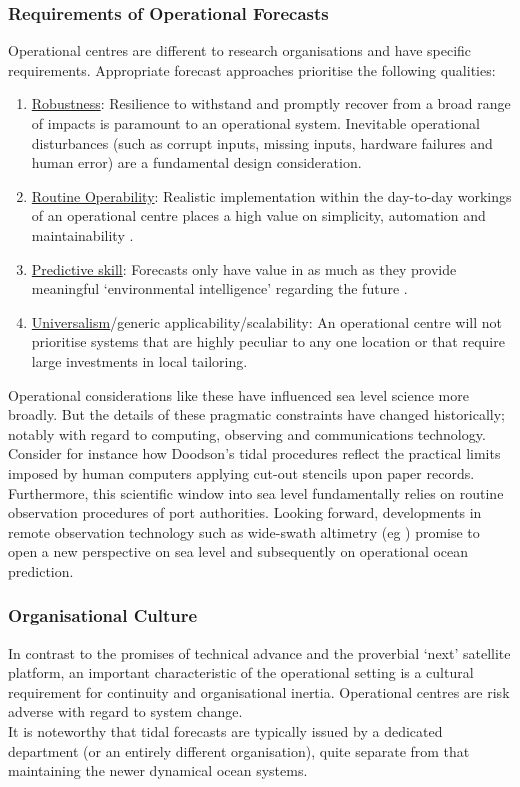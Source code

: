 \subsubsection{Requirements of Operational Forecasts}  
Operational centres are different to research organisations and have specific requirements. Appropriate forecast approaches prioritise the following qualities:
\begin{enumerate}
\item \underline{Robustness}: Resilience to withstand and promptly recover from a broad range of impacts is paramount to an operational system.  Inevitable operational disturbances (such as corrupt inputs, missing inputs, hardware failures and human error) are a fundamental design consideration.
\item \underline{Routine Operability}:  Realistic implementation within the day-to-day workings of an operational centre places a high value on simplicity, automation and maintainability .
\item \underline{Predictive skill}:  Forecasts only have value in as much as they provide meaningful `environmental intelligence' regarding the future \cite{BureauofMeterology:2010tq}.
\item \underline{Universalism}/generic applicability/scalability:  An operational centre will not prioritise systems that are highly peculiar to any one location or that require large investments in local tailoring.
\end{enumerate}



Operational considerations like these have influenced sea level science more broadly.   But the details of these pragmatic constraints have changed historically; notably with regard to computing, observing and communications technology.\\
Consider for instance how Doodson's \citep{Doodson:1928wf} tidal procedures reflect the practical limits imposed by human computers applying cut-out stencils upon paper records.  Furthermore, this scientific window into sea level fundamentally relies on routine observation procedures of port authorities.  Looking forward, developments in remote observation technology such as wide-swath altimetry (eg \citep{Ray:2011tj}) promise to open a new perspective on sea level and subsequently on operational ocean prediction. \\


\subsubsection{Organisational Culture}
In contrast to the promises of technical advance and the proverbial `next' satellite platform, an important characteristic of the operational  setting is a cultural requirement for continuity and organisational inertia.  Operational centres are risk adverse with regard to system change.  \\
It is noteworthy that tidal forecasts are typically issued by a dedicated department (or an entirely different organisation), quite separate from that maintaining the newer dynamical ocean systems.\\



